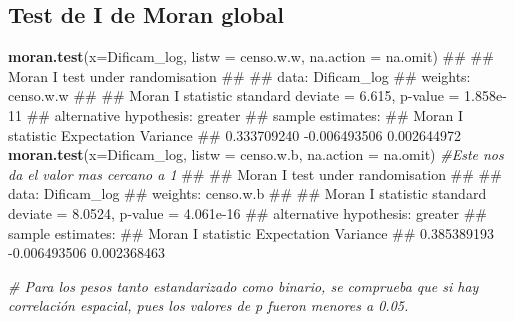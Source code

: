 \documentclass[11pt,]{article}
\newenvironment{Shaded}{\begin{snugshade}}{\end{snugshade}}
\newcommand{\KeywordTok}[1]{\textcolor[rgb]{0.13,0.29,0.53}{\textbf{#1}}}
\newcommand{\DataTypeTok}[1]{\textcolor[rgb]{0.13,0.29,0.53}{#1}}
\newcommand{\StringTok}[1]{\textcolor[rgb]{0.31,0.60,0.02}{#1}}
\newcommand{\CommentTok}[1]{\textcolor[rgb]{0.56,0.35,0.01}{\textit{#1}}}
\newcommand{\OperatorTok}[1]{\textcolor[rgb]{0.81,0.36,0.00}{\textbf{#1}}}
\newcommand{\NormalTok}[1]{#1}
\begin{document}
\begin{Shaded}
\end{Shaded}

\subsection{Test de I de Moran global}\label{test-de-i-de-moran-global}

\begin{Shaded}
\begin{Highlighting}[]
\KeywordTok{moran.test}\NormalTok{(}\DataTypeTok{x=}\NormalTok{Dificam_log, }\DataTypeTok{listw =}\NormalTok{ censo.w.w, }\DataTypeTok{na.action =}\NormalTok{ na.omit)}
\NormalTok{## }
\NormalTok{##  Moran I test under randomisation}
\NormalTok{## }
\NormalTok{## data:  Dificam_log  }
\NormalTok{## weights: censo.w.w    }
\NormalTok{## }
\NormalTok{## Moran I statistic standard deviate = 6.615, p-value = 1.858e-11}
\NormalTok{## alternative hypothesis: greater}
\NormalTok{## sample estimates:}
\NormalTok{## Moran I statistic       Expectation          Variance }
\NormalTok{##       0.333709240      -0.006493506       0.002644972}
\KeywordTok{moran.test}\NormalTok{(}\DataTypeTok{x=}\NormalTok{Dificam_log, }\DataTypeTok{listw =}\NormalTok{ censo.w.b, }\DataTypeTok{na.action =}\NormalTok{ na.omit)  }\CommentTok{#Este nos da el valor mas cercano a 1}
\NormalTok{## }
\NormalTok{##  Moran I test under randomisation}
\NormalTok{## }
\NormalTok{## data:  Dificam_log  }
\NormalTok{## weights: censo.w.b    }
\NormalTok{## }
\NormalTok{## Moran I statistic standard deviate = 8.0524, p-value = 4.061e-16}
\NormalTok{## alternative hypothesis: greater}
\NormalTok{## sample estimates:}
\NormalTok{## Moran I statistic       Expectation          Variance }
\NormalTok{##       0.385389193      -0.006493506       0.002368463}

\CommentTok{# Para los pesos tanto estandarizado como binario, se comprueba que si hay correlación espacial, pues los valores de p fueron menores a 0.05.}
\end{Highlighting}
\end{Shaded}
\end{document}

